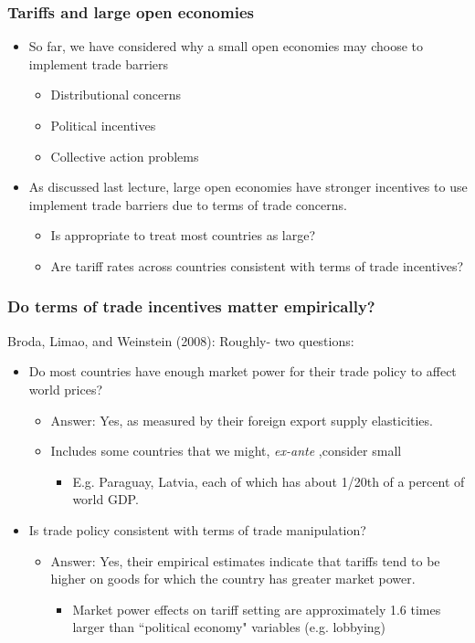 \documentclass{beamer}
\begin{document}
\begin{frame}
	\frametitle{Tariffs and large open economies}
	\begin{itemize}
	\item So far, we have considered why a small open economies may choose to implement trade barriers
		\begin{itemize}
			\item Distributional concerns
			\item Political incentives
			\item Collective action problems
		\end{itemize}
	\item As discussed last lecture, large open economies have stronger incentives to use implement trade barriers due to terms of trade concerns.
		\begin{itemize}
			\item Is appropriate to treat most countries as large?
			\item Are tariff rates across countries consistent with terms of trade incentives? 
		\end{itemize}
	\end{itemize}
	
\end{frame}

\begin{frame}
	\frametitle{Do terms of trade incentives matter empirically?}
	
Broda, Limao, and Weinstein (2008): Roughly- two questions: 
	\begin{itemize}
		\item Do most countries have enough market power for their trade policy to affect world prices?
			\begin{itemize}
				\item Answer: Yes, as measured by their foreign export supply elasticities. 
				\item Includes some countries that we might, \emph{ex-ante} ,consider small 
					\begin{itemize}
						\item E.g. Paraguay, Latvia, each of which has about 1/20th of a percent of world GDP.
					\end{itemize}
			\end{itemize}
		\item Is trade policy consistent with terms of trade manipulation?
			\begin{itemize}
				\item Answer: Yes, their empirical estimates indicate that tariffs tend to be higher on goods for which the country has greater market power.
					\begin{itemize}
						\item Market power effects on tariff setting are approximately 1.6 times larger than ``political economy" variables (e.g. lobbying)
					\end{itemize}
			\end{itemize}
	\end{itemize}
\end{frame}
\end{document}
